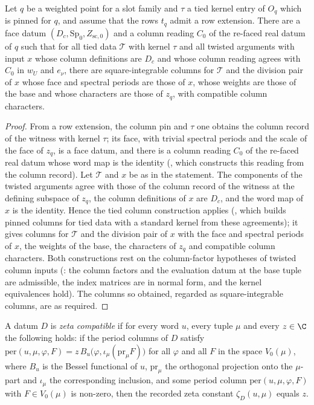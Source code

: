 \begin{lemma}\label{pf:bundles:lem:sqcols}
Let $q$ be a weighted point for a slot family and $\tau$ a tied kernel entry of $O_q$ which is pinned for $q$, and assume that the rows
$t_q$ admit a row extension. There are a face datum $(D_c,\mathrm{Sp}_0,Z_{\mathrm{sc},0})$ and a column reading $C_0$ of the re-faced real
datum of $q$ such that for all tied data $\mathcal T$ with kernel $\tau$ and all twisted arguments with input $x$ whose column definitions are
$D_c$ and whose column reading agrees with $C_0$ in $w_U$ and $e_\nu$, there are square-integrable columns for $\mathcal T$ and the division
pair of $x$ whose face and spectral periods are those of $x$, whose weights are those of the base and whose characters are those of $z_q$, with
compatible column characters.
\end{lemma}

\begin{proof}
From a row extension, the column pin and $\tau$ one obtains the column record of the witness with kernel $\tau$; its face, with trivial
spectral periods and the scale of the face of $z_q$, is a face datum, and there is a column reading $C_0$ of the re-faced real datum whose
word map is the identity (, which constructs this reading from the column
record). Let
$\mathcal T$ and $x$ be as in the statement. The components of the twisted arguments agree with those of the column record of the witness at the
defining subspace of $z_q$, the column definitions of $x$ are $D_c$, and the word map of $x$ is the identity. Hence the tied column construction
applies (, which builds pinned columns for tied data with a standard kernel
from these agreements); it gives columns for $\mathcal T$ and the division pair of $x$ with the face and spectral periods of $x$, the weights of
the base, the characters of $z_q$ and compatible column characters. Both constructions rest on the column-factor hypotheses of twisted column
inputs (: the column factors and the evaluation datum at the base tuple are admissible,
the index matrices are in normal form, and the kernel equivalences hold). The columns so obtained, regarded as square-integrable columns, are
as required.
\end{proof}

\begin{definition}\label{pf:bundles:def:zeta}
A datum $D$ is \emph{zeta compatible} if for every word $u$, every tuple $\mu$ and every $z\in\C$ the following holds: if the period
columns of $D$ satisfy $\mathrm{per}(u,\mu,\varphi,F)=z\,B_u\bigl(\varphi,\iota_\mu(\mathrm{pr}_\mu F)\bigr)$ for all $\varphi$ and all
$F$ in the space $V_0(\mu)$, where $B_u$ is the Bessel functional of $u$, $\mathrm{pr}_\mu$ the orthogonal projection onto the
$\mu$-part and $\iota_\mu$ the corresponding inclusion, and some period column $\mathrm{per}(u,\mu,\varphi,F)$ with $F\in V_0(\mu)$ is
non-zero, then the recorded zeta constant $\zeta_D(u,\mu)$ equals $z$.
\end{definition}

